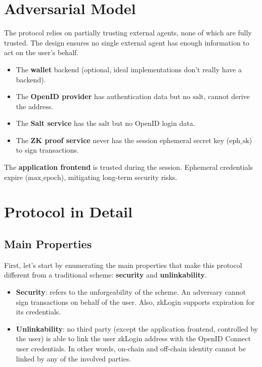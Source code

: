 \documentclass{article}
\begin{document}
\section{Adversarial Model}

The protocol relies on partially trusting external agents, none of which are fully trusted.
The design ensures no single external agent has enough information to act on the user's behalf.
\begin{itemize}
    \item The \textbf{wallet} backend (optional, ideal implementations don't really have a backend).
    \item The \textbf{OpenID provider} has authentication data but no $\text{salt}$, cannot derive the address.
    \item The \textbf{Salt service} has the $\text{salt}$ but no OpenID login data.
    \item The \textbf{ZK proof service} never has the session ephemeral secret key ($\text{eph\_sk}$) to sign transactions.
\end{itemize}
The \textbf{application frontend} is trusted during the session. Ephemeral credentials expire ($\text{max\_epoch}$), mitigating long-term security risks.

\section{Protocol in Detail}

\subsection{Main Properties}
First, let's start by enumerating the main properties that make this protocol different from a traditional scheme: \textbf{security} and \textbf{unlinkability}.
\begin{itemize}
    \item \textbf{Security}: refers to the unforgeability of the scheme. An adversary cannot sign transactions on behalf of the user. Also, zkLogin supports expiration for its credentials.
    \item \textbf{Unlinkability}: no third party (except the application frontend, controlled by the user) is able to link the user zkLogin address with the OpenID Connect user credentials. In other words, on-chain and off-chain identity cannot be linked by any of the involved parties.
\end{itemize}
\end{document}
